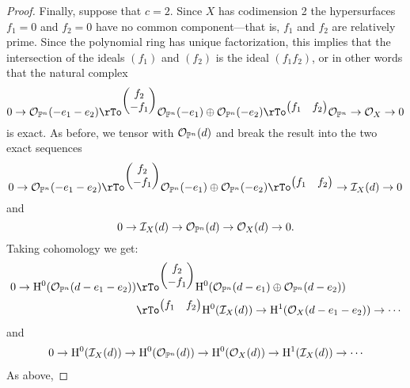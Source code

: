 \documentclass[12pt, leqno]{book}
\begin{document}
\begin{proof}
Finally, suppose that $c=2$. Since $X$ has codimension 2 the hypersurfaces $f_{1}=0$ and $f_{2}=0$ have no common component---that is, $f_{1}$ and $f_{2}$ are relatively prime. Since the polynomial ring has unique factorization, this implies that the intersection of the ideals $(f_{1})$ and $(f_{2})$ is the ideal
$(f_{1}f_{2})$, or in other words that the natural complex
$$
0\to\cO_{\PP^{n}}(-e_{1}-e_{2}) \rTo^{
\begin{pmatrix}
 f_{2}\\-f_{1}
\end{pmatrix}}
 \cO_{\PP^{n}}(-e_{1})\oplus \cO_{\PP^{n}}(-e_{2}) \rTo^{
 \begin{pmatrix}
 f_{1}&f_{2}
\end{pmatrix}}
\cO_{\PP^{n}}
\to
\cO_{X}
\to 0
$$
is exact. As before, we tensor with ${\mathcal O}_{{\mathbb P}^{n}}(d)$ and break the result into the two exact sequences
$$
0\to\cO_{\PP^{n}}(-e_{1}-e_{2}) \rTo^{
\begin{pmatrix}
 f_{2}\\-f_{1}
\end{pmatrix}}
 \cO_{\PP^{n}}(-e_{1})\oplus \cO_{\PP^{n}}(-e_{2}) \rTo^{
 \begin{pmatrix}
 f_{1}&f_{2}
\end{pmatrix}}
\to \cI_{X}(d) \to 0
$$
and
$$
0\to {\mathcal I}_{X}(d) \to {\mathcal O}_{{\mathbb P}^{n}}(d) \to {\mathcal O}_{X}(d) \to 0.
$$
Taking cohomology we get:
\begin{align*}
0\to\HH^{0}(\cO_{\PP^{n}}(d-e_{1}-e_{2}))
&\rTo^{
\begin{pmatrix}
 f_{2}\\-f_{1}
\end{pmatrix}}
\HH^{0}( \cO_{\PP^{n}}(d-e_{1})\oplus \cO_{\PP^{n}}(d-e_{2}))\\
 &\rTo^{
 \begin{pmatrix}
 f_{1}&f_{2}
\end{pmatrix}}
\HH^{0}(\cI_{X}(d))\to \HH^{1}(\cO_{X}(d-e_{1}-e_{2})) \to \cdots
\end{align*}
and
\begin{align*}
0\to {\rm{H}}^{0}({\mathcal I}_{X}(d))\to
{\rm{H}}^{0}({\mathcal O}_{{\mathbb P}^{n}}(d))
\to {\rm{H}}^{0}({\mathcal O}_{X}(d)) \to
{\rm{H}}^{1}({\mathcal I}_{X}(d))\to\cdots
\end{align*}
As above, 
\end{proof}
\end{document}
